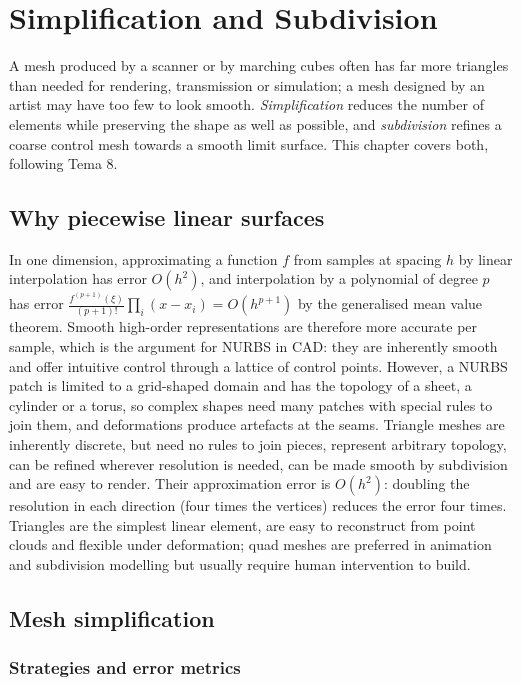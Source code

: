 \chapter{Simplification and Subdivision}\label{ch:ops}

A mesh produced by a scanner or by marching cubes often has far more triangles than needed for
rendering, transmission or simulation; a mesh designed by an artist may have too few to look
smooth. \emph{Simplification} reduces the number of elements while preserving the shape as well
as possible, and \emph{subdivision} refines a coarse control mesh towards a smooth limit surface.
This chapter covers both, following Tema 8.

\section{Why piecewise linear surfaces}

In one dimension, approximating a function $f$ from samples at spacing $h$ by linear interpolation
has error $O(h^2)$, and interpolation by a polynomial of degree $p$ has error
$\frac{f^{(p+1)}(\xi)}{(p+1)!}\prod_i(x-x_i)=O(h^{p+1})$ by the generalised mean value theorem. Smooth
high-order representations are therefore more accurate per sample, which is the argument for
NURBS in CAD: they are inherently smooth and offer intuitive control through a lattice of control
points. However, a NURBS patch is limited to a grid-shaped domain and has the topology of a sheet,
a cylinder or a torus, so complex shapes need many patches with special rules to join them, and
deformations produce artefacts at the seams. Triangle meshes are inherently discrete, but need no
rules to join pieces, represent arbitrary topology, can be refined wherever resolution is needed,
can be made smooth by subdivision and are easy to render. Their approximation error is $O(h^2)$:
doubling the resolution in each direction (four times the vertices) reduces the error four times.
Triangles are the simplest linear element, are easy to reconstruct from point clouds and flexible
under deformation; quad meshes are preferred in animation and subdivision modelling but usually
require human intervention to build.

\section{Mesh simplification}

\subsection{Strategies and error metrics}

